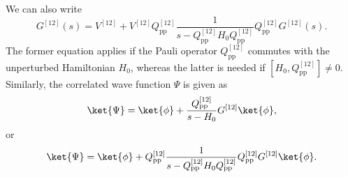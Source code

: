 We can also write  
\begin{equation}
      G^{[12]}(s )=V^{[12]}+V^{[12]}Q^{[12]}_{\mathrm{pp}}
      \frac{1}{s -Q^{[12]}_{\mathrm{pp}}H_0Q^{[12]}_{\mathrm{pp}}}
      Q^{[12]}_{\mathrm{pp}}
      G^{[12]}(s ).
      \label{Morten:eq:g2}
\end{equation}
The former equation applies if the Pauli operator 
$Q^{[12]}_{\mathrm{pp}}$  commutes
with the unperturbed Hamiltonian $H_0$, whereas the latter is
needed if $[H_0,Q^{[12]}_{\mathrm{pp}}]\neq 0$.
Similarly, the correlated wave function $\Psi$
is given as
\begin{equation}
    \ket{\Psi}=\ket{\phi}+
    \frac{Q^{[12]}_{\mathrm{pp}}}{s - H_0}G^{[12]}\ket{\phi},
    \label{Morten:eq:wave}
\end{equation}
or
\begin{equation}
   \ket{\Psi}=\ket{\phi}+Q^{[12]}_{\mathrm{pp}}\frac{1}
    {s - Q^{[12]}_{\mathrm{pp}}H_0Q^{[12]}_{\mathrm{pp}}}
    Q^{[12]}_{\mathrm{pp}}G^{[12]}\ket{\phi}.
\end{equation}


